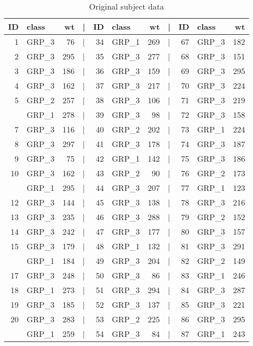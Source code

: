 \documentclass[smallextended]{svjour3}       %
\begin{document}
\begin{table}

\caption{\label{tab:subject-weights}Original subject data}
\centering
\begin{tabular}[t]{rlrlrlrlrlr}
\toprule
ID & class & wt & | & ID & class & wt & | & ID & class & wt\\
\midrule
1 & GRP\_3 & 76 & | & 34 & GRP\_1 & 269 & | & 67 & GRP\_3 & 182\\
2 & GRP\_3 & 295 & | & 35 & GRP\_3 & 277 & | & 68 & GRP\_3 & 151\\
3 & GRP\_3 & 186 & | & 36 & GRP\_3 & 159 & | & 69 & GRP\_3 & 295\\
4 & GRP\_3 & 162 & | & 37 & GRP\_3 & 217 & | & 70 & GRP\_3 & 224\\
5 & GRP\_2 & 257 & | & 38 & GRP\_3 & 106 & | & 71 & GRP\_3 & 219\\
\addlinespace
6 & GRP\_1 & 278 & | & 39 & GRP\_3 & 98 & | & 72 & GRP\_3 & 158\\
7 & GRP\_3 & 116 & | & 40 & GRP\_2 & 202 & | & 73 & GRP\_1 & 224\\
8 & GRP\_3 & 297 & | & 41 & GRP\_3 & 178 & | & 74 & GRP\_3 & 187\\
9 & GRP\_3 & 75 & | & 42 & GRP\_1 & 142 & | & 75 & GRP\_3 & 186\\
10 & GRP\_3 & 162 & | & 43 & GRP\_2 & 90 & | & 76 & GRP\_2 & 173\\
\addlinespace
11 & GRP\_1 & 295 & | & 44 & GRP\_3 & 207 & | & 77 & GRP\_1 & 123\\
12 & GRP\_3 & 144 & | & 45 & GRP\_3 & 138 & | & 78 & GRP\_3 & 216\\
13 & GRP\_3 & 235 & | & 46 & GRP\_3 & 288 & | & 79 & GRP\_2 & 152\\
14 & GRP\_3 & 242 & | & 47 & GRP\_3 & 177 & | & 80 & GRP\_3 & 157\\
15 & GRP\_3 & 179 & | & 48 & GRP\_1 & 132 & | & 81 & GRP\_3 & 291\\
\addlinespace
16 & GRP\_1 & 184 & | & 49 & GRP\_3 & 204 & | & 82 & GRP\_2 & 149\\
17 & GRP\_3 & 248 & | & 50 & GRP\_3 & 86 & | & 83 & GRP\_1 & 246\\
18 & GRP\_1 & 273 & | & 51 & GRP\_3 & 294 & | & 84 & GRP\_3 & 287\\
19 & GRP\_3 & 185 & | & 52 & GRP\_3 & 137 & | & 85 & GRP\_3 & 221\\
20 & GRP\_3 & 283 & | & 53 & GRP\_2 & 225 & | & 86 & GRP\_3 & 295\\
\addlinespace
21 & GRP\_1 & 259 & | & 54 & GRP\_3 & 84 & | & 87 & GRP\_1 & 243\\

\end{tabular}
\end{table}
\end{document}
